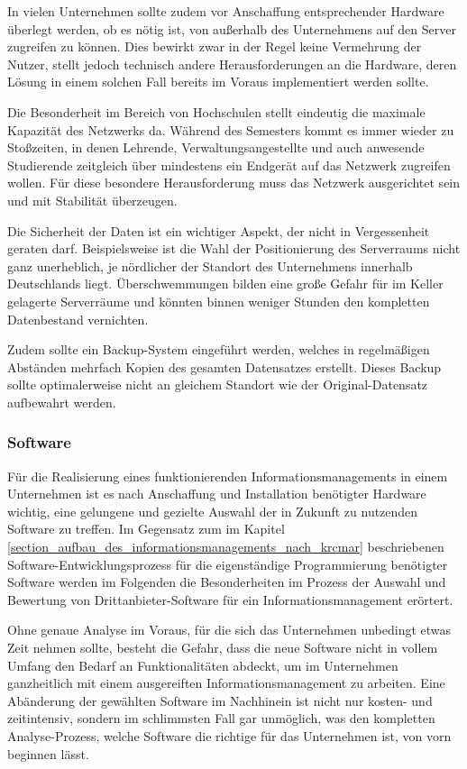 In vielen Unternehmen sollte zudem vor Anschaffung entsprechender Hardware überlegt werden, ob 
es nötig ist, von außerhalb des Unternehmens auf den Server zugreifen zu können. Dies bewirkt 
zwar in der Regel keine Vermehrung der Nutzer, stellt jedoch technisch andere Herausforderungen 
an die Hardware, deren Lösung in einem solchen Fall bereits im Voraus implementiert werden sollte.

Die Besonderheit im Bereich von Hochschulen stellt eindeutig die maximale Kapazität des Netzwerks 
da. Während des Semesters kommt es immer wieder zu Stoßzeiten, in denen Lehrende, 
Verwaltungsangestellte und auch anwesende Studierende zeitgleich über mindestens ein Endgerät 
auf das Netzwerk zugreifen wollen. Für diese besondere Herausforderung muss das Netzwerk 
ausgerichtet sein und mit Stabilität überzeugen.

Die Sicherheit der Daten ist ein wichtiger Aspekt, der nicht in Vergessenheit geraten darf. 
Beispielsweise ist die Wahl der Positionierung des Serverraums nicht ganz unerheblich, je nördlicher 
der Standort des Unternehmens innerhalb Deutschlands liegt. Überschwemmungen bilden eine große 
Gefahr für im Keller gelagerte Serverräume und könnten binnen weniger Stunden den kompletten 
Datenbestand vernichten.

Zudem sollte ein Backup-System eingeführt werden, welches in regelmäßigen Abständen mehrfach 
Kopien des gesamten Datensatzes erstellt. Dieses Backup sollte optimalerweise nicht an gleichem 
Standort wie der Original-Datensatz aufbewahrt werden.

\subsubsection{Software}
Für die Realisierung eines funktionierenden Informationsmanagements in einem Unternehmen ist es 
nach Anschaffung und Installation benötigter Hardware wichtig, eine gelungene und gezielte Auswahl 
der in Zukunft zu nutzenden Software zu treffen. Im Gegensatz zum im Kapitel 
\ref{section_aufbau_des_informationsmanagements_nach_krcmar} beschriebenen 
Software-Entwicklungsprozess für die eigenständige Programmierung benötigter Software werden im 
Folgenden die Besonderheiten im Prozess der Auswahl und Bewertung von Drittanbieter-Software für 
ein Informationsmanagement erörtert.

Ohne genaue Analyse im Voraus, für die sich das Unternehmen unbedingt etwas Zeit nehmen sollte, 
besteht die Gefahr, dass die neue Software nicht in vollem Umfang den Bedarf an Funktionalitäten 
abdeckt, um im Unternehmen ganzheitlich mit einem ausgereiften Informationsmanagement zu arbeiten. 
Eine Abänderung der gewählten Software im Nachhinein ist nicht nur kosten- und zeitintensiv, sondern 
im schlimmsten Fall gar unmöglich, was den kompletten Analyse-Prozess, welche Software die 
richtige für das Unternehmen ist, von vorn beginnen lässt.

